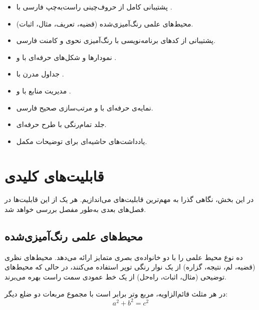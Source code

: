 \begin{itemize}
    \item پشتیبانی کامل از حروف‌چینی راست‌به‌چپ
    فارسی با .
    \item محیط‌های علمی رنگ‌آمیزی‌شده (قضیه، تعریف،
    مثال، اثبات).
    \item پشتیبانی از کدهای برنامه‌نویسی با
    رنگ‌آمیزی نحوی و کامنت فارسی.
    \item نمودارها و شکل‌های حرفه‌ای با  و
    .
    \item جداول مدرن با .
    \item مدیریت منابع با  و .
    \item نمایه‌ی حرفه‌ای با  و مرتب‌سازی
    صحیح فارسی.
    \item جلد تمام‌رنگی با طرح حرفه‌ای.
    \item یادداشت‌های حاشیه‌ای برای توضیحات مکمل.
\end{itemize}


\section{قابلیت‌های کلیدی}
\label{sec:introduction-features}

در این بخش، نگاهی گذرا به مهم‌ترین قابلیت‌های
 می‌اندازیم. هر یک از این قابلیت‌ها
در فصل‌های بعدی به‌طور مفصل بررسی خواهد شد.

\subsection{محیط‌های علمی رنگ‌آمیزی‌شده}
\label{sec:introduction-environments}

 ده نوع محیط علمی را با دو خانواده‌ی
بصری متمایز ارائه می‌دهد. محیط‌های نظری (قضیه، لم،
نتیجه، گزاره) از یک نوار رنگی توپر استفاده
می‌کنند، در حالی که محیط‌های توضیحی (مثال، اثبات،
راه‌حل) از یک خط عمودی سمت راست بهره می‌برند.


\begin{theorem}
    در هر مثلث قائم‌الزاویه، مربع وتر برابر است با
    مجموع مربعات دو ضلع دیگر:
    \[
        a^{2} + b^{2} = c^{2}
    \]
    \label{thm:pythagoras-intro}
\end{theorem}

